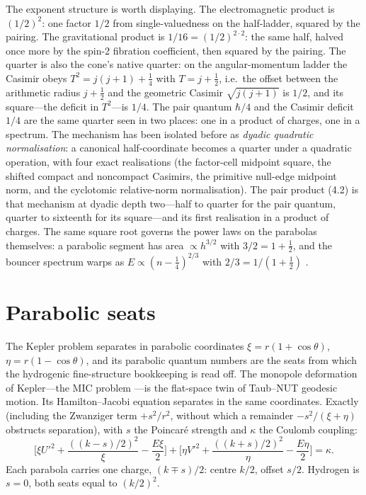 \documentclass[11pt]{article}
\numberwithin{equation}{section}
\begin{document}
The exponent structure is worth displaying. The electromagnetic product is
$(1/2)^2$: one factor $1/2$ from single-valuedness on the half-ladder,
squared by the pairing. The gravitational product is
$1/16=(1/2)^{2\cdot2}$: the same half, halved once more by the spin-2
fibration coefficient, then squared by the pairing. The quarter is also the
cone's native quarter: on the angular-momentum ladder the Casimir obeys
$T^2=j(j+1)+\tfrac14$ with $T=j+\tfrac12$, i.e.\ the offset between the
arithmetic radius $j+\tfrac12$ and the geometric Casimir $\sqrt{j(j+1)}$ is
$1/2$, and its square---the deficit in $T^2$---is $1/4$. The pair quantum
$\hbar/4$ and the Casimir deficit $1/4$ are the same quarter seen in two
places: one in a product of charges, one in a spectrum. The mechanism has
been isolated before \cite{EbertCas} as \emph{dyadic quadratic
normalisation}: a canonical half-coordinate becomes a quarter under a
quadratic operation, with four exact realisations (the factor-cell
midpoint square, the shifted compact and noncompact Casimirs, the
primitive null-edge midpoint norm, and the cyclotomic relative-norm
normalisation). The pair product (4.2) is that mechanism at dyadic depth
two---half to quarter for the pair quantum, quarter to sixteenth for its
square---and its first realisation in a product of charges. The same
square root governs the power laws on the parabolas themselves: a
parabolic segment has area $\propto h^{3/2}$ with $3/2=1+\tfrac12$, and the
bouncer spectrum warps as $E\propto(n-\tfrac14)^{2/3}$ with
$2/3=1/(1+\tfrac12)$ \cite{EbertSecant}.

\section{Parabolic seats}

The Kepler problem separates in parabolic coordinates
$\xi=r(1+\cos\theta)$, $\eta=r(1-\cos\theta)$, and its parabolic quantum
numbers are the seats from which the hydrogenic fine-structure bookkeeping
is read off. The monopole deformation of Kepler---the MIC problem
\cite{MIC,Zwanziger}---is the flat-space twin of Taub--NUT geodesic motion.
Its Hamilton--Jacobi equation separates in the same coordinates. Exactly
(including the Zwanziger term $+s^2/r^2$, without which a remainder
$-s^2/(\xi+\eta)$ obstructs separation), with $s$ the Poincar\'e strength
and $\kappa$ the Coulomb coupling:
\begin{equation}
\Big[\xi U'^2+\frac{((k-s)/2)^2}{\xi}-\frac{E\xi}{2}\Big]
+\Big[\eta V'^2+\frac{((k+s)/2)^2}{\eta}-\frac{E\eta}{2}\Big]=\kappa .
\end{equation}
Each parabola carries one charge, $(k\mp s)/2$: centre $k/2$, offset $s/2$.
Hydrogen is $s=0$, both seats equal to $(k/2)^2$.
\end{document}
